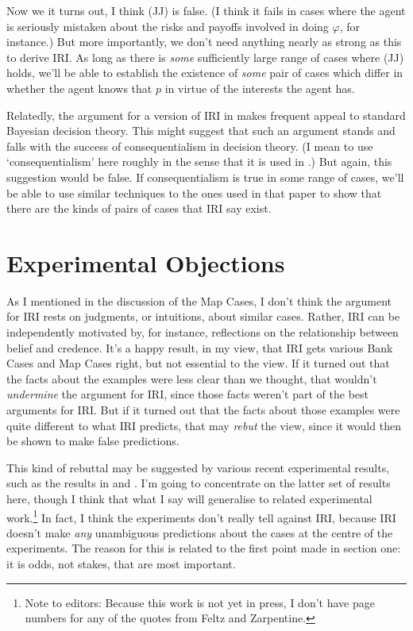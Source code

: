 \documentclass[oneside, a4paper]{book}
\begin{document}
\noindent Now we it turns out, I think (JJ) is false. (I think it fails in cases where the agent is seriously mistaken about the risks and payoffs involved in doing $\varphi$, for instance.) But more importantly, we don't need anything nearly as strong as this to derive IRI. As long as there is \textit{some} sufficiently large range of cases where (JJ) holds, we'll be able to establish the existence of \textit{some} pair of cases which differ in whether the agent knows that $p$ in virtue of the interests the agent has.

Relatedly, the argument for a version of IRI in \cite{Weatherson2005-WEACWD} makes frequent appeal to standard Bayesian decision theory. This might suggest that such an argument stands and falls with the success of consequentialism in decision theory. (I mean to use `consequentialism' here roughly in the sense that it is used in \cite{Hammond1988}.) But again, this suggestion would be false. If consequentialism is true in some range of cases, we'll be able to use similar techniques to the ones used in that paper to show that there are the kinds of pairs of cases that IRI say exist.

\section{Experimental Objections} \label{sect:xphi}
As I mentioned in the discussion of the Map Cases, I don't think the argument for IRI rests on judgments, or intuitions, about similar cases. Rather, IRI can be independently motivated by, for instance, reflections on the relationship between belief and credence. It's a happy result, in my view, that IRI gets various Bank Cases and Map Cases right, but not essential to the view. If it turned out that the facts about the examples were less clear than we thought, that wouldn't \textit{undermine} the argument for IRI, since those facts weren't part of the best arguments for IRI. But if it turned out that the facts about those examples were quite different to what IRI predicts, that may \textit{rebut} the view, since it would then be shown to make false predictions.

This kind of rebuttal may be suggested by various recent experimental results, such as the results in \cite{May2010} and \cite{FeltzZarpentine2010}. I'm going to concentrate on the latter set of results here, though I think that what I say will generalise to related experimental work.\footnote{Note to editors: Because this work is not yet in press, I don't have page numbers for any of the quotes from Feltz and Zarpentine.} In fact, I think the experiments don't really tell against IRI, because IRI doesn't make \textit{any} unambiguous predictions about the cases at the centre of the experiments. The reason for this is related to the first point made in section one: it is odds, not stakes, that are most important.
\end{document}
